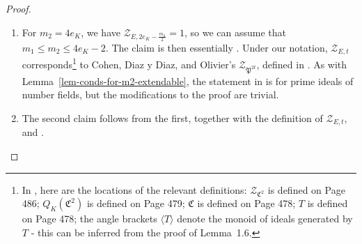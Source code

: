 \documentclass[11pt]{amsart}
\theoremstyle{theorem}
\theoremstyle{example}
\theoremstyle{definition}
\numberwithin{theorem}{section}
\numberwithin{theorem}{section}
\begin{document}
\begin{proof}
    \hfill
    \begin{enumerate}
    \item For $m_2 = 4e_K$, we have $\mathcal{Z}_{E,2e_K - \frac{m_2}{2}} = 1$, so we can assume that $m_1 \leq m_2 \leq 4e_K - 2$. 
    The claim is then essentially \cite[Corollary~3.13]{cohen-et-al}. Under our notation, $\mathcal{Z}_{E,t}$ corresponds\footnote{In \cite{cohen-et-al}, here are the locations of the relevant definitions: $\mathcal{Z}_{\mathfrak{C}^2}$ is defined on Page 486; $Q_K(\mathfrak{C}^2)$ is defined on Page 479; $\mathfrak{C}$ is defined on Page 478; $T$ is defined on Page 478; the angle brackets $\langle T\rangle$ denote the monoid of ideals generated by $T$ - this can be inferred from the proof of Lemma~1.6.} to Cohen, Diaz y Diaz, and Olivier's $\mathcal{Z}_{\mathfrak{P}^{2t}}$, defined in \cite[Page~486]{cohen-et-al}. As with Lemma~\ref{lem-conds-for-m2-extendable}, the statement in \cite{cohen-et-al} is for prime ideals of number fields, but the modifications to the proof are trivial. 
    \item The second claim follows from the first, together with the definition of $\mathcal{Z}_{E,t}$, and \cite[Proposition~3.7]{neukirch-bonn}. 
    \end{enumerate}
\end{proof}
\end{document}
